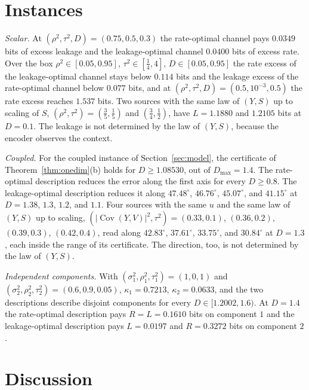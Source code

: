 \documentclass[11pt,onecolumn]{IEEEtran}
\newcommand{\Cov}{\operatorname{Cov}}
\begin{document}
\section{Instances}
\label{sec:examples}

\emph{Scalar.} At $(\rho^2,\tau^2,D)=(0.75,0.5,0.3)$ the rate-optimal
channel pays $0.0349$ bits of excess leakage and the leakage-optimal
channel $0.0400$ bits of excess rate. Over the box
$\rho^2\in[0.05,0.95]$, $\tau^2\in[\tfrac14,4]$, $D\in[0.05,0.95]$ the
rate excess of the leakage-optimal channel stays below $0.114$ bits and
the leakage excess of the rate-optimal channel below $0.077$ bits, and at
$(\rho^2,\tau^2,D)=(0.5,10^{-3},0.5)$ the rate excess reaches $1.537$ bits.
Two sources with the same law of $(Y,S)$ up to scaling of $S$,
$(\rho^2,\tau^2)=(\tfrac35,\tfrac15)$ and $(\tfrac34,\tfrac12)$, have
$L=1.1880$ and $1.2105$ bits at $D=0.1$. The leakage is not determined by
the law of $(Y,S)$, because the encoder observes the context.

\emph{Coupled.} For the coupled instance of Section~\ref{sec:model},
the certificate of Theorem~\ref{thm:onedim}(b) holds for $D\ge1.08530$,
out of $D_{\max}=1.4$. The rate-optimal description reduces the error along the
first axis for every $D\ge0.8$. The leakage-optimal description reduces
it along $47.48^\circ$, $46.76^\circ$, $45.07^\circ$, and $41.15^\circ$ at
$D=1.38$, $1.3$, $1.2$, and $1.1$. Four sources with the same $u$ and the same law of
$(Y,S)$ up to scaling, $(|\Cov(Y,V)|^2,\tau^2)=(0.33,0.1)$, $(0.36,0.2)$,
$(0.39,0.3)$, $(0.42,0.4)$, read along $42.83^\circ$, $37.61^\circ$,
$33.75^\circ$, and $30.84^\circ$ at $D=1.3$, each inside the range of its certificate.
The direction, too, is not
determined by the law of $(Y,S)$.

\emph{Independent components.} With
$(\sigma_1^2,\rho_1^2,\tau_1^2)=(1,0,1)$ and
$(\sigma_2^2,\rho_2^2,\tau_2^2)=(0.6,0.9,0.05)$,
$\kappa_1=0.7213$, $\kappa_2=0.0633$, and the two descriptions describe
disjoint components for every $D\in[1.2002,1.6)$. At $D=1.4$ the
rate-optimal description pays $R=L=0.1610$ bits on component $1$ and the
leakage-optimal description pays $L=0.0197$ and $R=0.3272$ bits on
component $2$.

\section{Discussion}
\label{sec:discussion}
\end{document}
